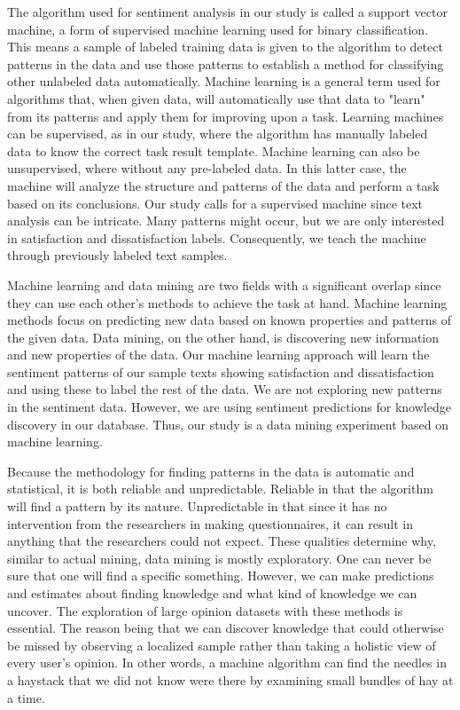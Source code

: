\documentclass[smallextended,natbib]{svjour3}       %
\begin{document}
    The algorithm used for sentiment analysis in our study is called a support vector machine, a form of supervised machine learning used for binary classification. This means a sample of labeled training data is given to the algorithm to detect patterns in the data and use those patterns to establish a method for classifying other unlabeled data automatically. Machine learning is a general term used for algorithms that, when given data, will automatically use that data to "learn" from its patterns and apply them for improving upon a task. Learning machines can be supervised, as in our study, where the algorithm has manually labeled data to know the correct task result template. Machine learning can also be unsupervised, where without any pre-labeled data. In this latter case, the machine will analyze the structure and patterns of the data and perform a task based on its conclusions. Our study calls for a supervised machine since text analysis can be intricate. Many patterns might occur, but we are only interested in satisfaction and dissatisfaction labels. Consequently, we teach the machine through previously labeled text samples. 

    Machine learning and data mining are two fields with a significant overlap since they can use each other's methods to achieve the task at hand. Machine learning methods focus on predicting new data based on known properties and patterns of the given data. Data mining, on the other hand, is discovering new information and new properties of the data. Our machine learning approach will learn the sentiment patterns of our sample texts showing satisfaction and dissatisfaction and using these to label the rest of the data. We are not exploring new patterns in the sentiment data. However, we are using sentiment predictions for knowledge discovery in our database. Thus, our study is a data mining experiment based on machine learning.

    Because the methodology for finding patterns in the data is automatic and statistical, it is both reliable and unpredictable. Reliable in that the algorithm will find a pattern by its nature. Unpredictable in that since it has no intervention from the researchers in making questionnaires, it can result in anything that the researchers could not expect. These qualities determine why, similar to actual mining, data mining is mostly exploratory. One can never be sure that one will find a specific something. However, we can make predictions and estimates about finding knowledge and what kind of knowledge we can uncover. The exploration of large opinion datasets with these methods is essential. The reason being that we can discover knowledge that could otherwise be missed by observing a localized sample rather than taking a holistic view of every user's opinion. In other words, a machine algorithm can find the needles in a haystack that we did not know were there by examining small bundles of hay at a time.
\end{document}
